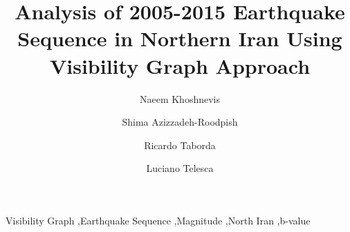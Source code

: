 \documentclass[a4paper,review]{elsarticle}
\begin{document}
\begin{frontmatter}

\title{Analysis of 2005-2015 Earthquake Sequence in Northern Iran Using Visibility Graph Approach}

\author[label1]{Naeem Khoshnevis}
\author[label1,label2]{Shima Azizzadeh-Roodpish}
\author[label1,label2]{Ricardo Taborda}
\author[label3]{Luciano Telesca}

\address[label1]{Center for Earthquake Research and Information, University of Memphis, 3890 Central Ave., Memphis TN 38152, USA}
\address[label2]{Department of Civil Engineering, University of Memphis, 3890 Central Ave., Memphis TN 38152, USA}
\address[label3]{Institute of Methodologies for Environmental Analysis, National Research Council, Tito, Italy}



\begin{keyword}
Visibility Graph \sep Earthquake Sequence \sep Magnitude \sep North Iran \sep b-value 



\end{keyword}

\end{frontmatter}
















\end{document}
